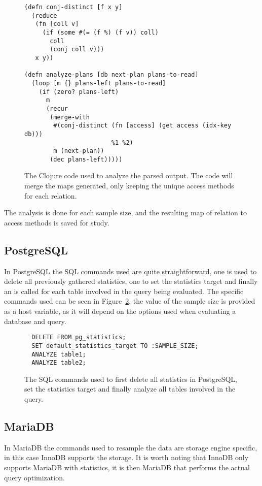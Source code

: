 \begin{figure}[ht]
\begin{verbatim}
(defn conj-distinct [f x y]
  (reduce
   (fn [coll v]
     (if (some #(= (f %) (f v)) coll)
       coll
       (conj coll v)))
   x y))

(defn analyze-plans [db next-plan plans-to-read]
  (loop [m {} plans-left plans-to-read]
    (if (zero? plans-left)
      m
      (recur
       (merge-with
        #(conj-distinct (fn [access] (get access (idx-key db)))
                        %1 %2)
        m (next-plan))
       (dec plans-left)))))
   \end{verbatim}
   \caption[The clojure code to analyze a query]{The Clojure code used to
     analyze the parsed output. The code will merge the maps generated, only
     keeping the unique access methods for each relation.}
\label{fig:clj:analyzing}
\end{figure}

The analysis is done for each sample size, and the resulting map of relation to
access methods is saved for study.

\subsection{PostgreSQL}\label{sec:postgresql}
In PostgreSQL the SQL commands used are quite straightforward, one is used to
delete all previously gathered statistics, one to set the statistics target and
finally an  is called for each table involved in the query being
evaluated. The specific commands used can be seen in
Figure~\ref{fig:sql:pganalyze}, the value of the sample size is provided as a
host variable, as it will depend on the options used when evaluating a database
and query.

\begin{figure}[ht]
\begin{verbatim}
  DELETE FROM pg_statistics;
  SET default_statistics_target TO :SAMPLE_SIZE;
  ANALYZE table1;
  ANALYZE table2;
\end{verbatim}
\caption[The SQL commands used to resample inPostgreSQL.]{The SQL commands used
  to first delete all statistics in PostgreSQL, set the statistics target and
  finally analyze all tables involved in the query.}
\label{fig:sql:pganalyze}
\end{figure}

\subsection{MariaDB}\label{sec:mariadb}
In MariaDB the commands used to resample the data are storage engine specific,
in this case InnoDB supports the storage. It is worth noting that InnoDB only
supports MariaDB with statistics, it is then MariaDB that performs the actual
query optimization.

